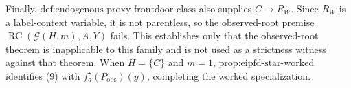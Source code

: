 Finally, \(\text{def:endogenous-proxy-frontdoor-class}\) also supplies \(C\to R_W\). Since \(R_W\) is a label-context variable, it is not parentless, so the observed-root premise \(\operatorname{RC}(\mathcal G(H,m),A,Y)\) fails. This establishes only that the observed-root theorem is inapplicable to this family and is not used as a strictness witness against that theorem. When \(H=\{C\}\) and \(m=1\), \(\text{prop:eipfd-star-worked}\) identifies (9) with \(f_a^\star(P_{\mathrm{obs}})(y)\), completing the worked specialization.
